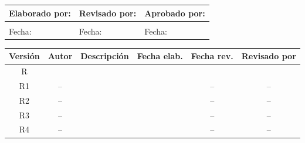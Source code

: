 \begin{titlepage}
	\thispagestyle{corporativo}

	\vspace*{1.5cm}

	\centering
	{\Large\bfseries \projecttitle}

	\vspace{3cm}

	\begin{center}
	\fontsize{10}{12}\selectfont
	\renewcommand{\arraystretch}{1.5}
	\setlength{\tabcolsep}{4pt}

	\begin{tabular}{|p{}|p{}|p{}|}
		\hline
		\rowcolor{green!15}
		\textbf{Elaborado por:} & \textbf{Revisado por:} & \textbf{Aprobado por:} \\
		\hline
		\centering\arraybackslash\vspace{1.2cm} \firmaElaboro & \centering\arraybackslash\vspace{1.2cm} \firmaReviso & \centering\arraybackslash\vspace{1.2cm} \firmaAprobo \\
		\hline
		\centering\arraybackslash Fecha: \fechaElaboro & \centering\arraybackslash Fecha: \fechaReviso & \centering\arraybackslash Fecha: \fechaAprobo \\
		\hline
	\end{tabular}
	\end{center}

	\vspace{2.5cm}

	\begin{center}
	\fontsize{10}{12}\selectfont
	\renewcommand{\arraystretch}{1.2}
	\setlength{\tabcolsep}{3pt}

	\begin{tabular}{|c|c|p{}|c|c|c|}
		\hline
		\rowcolor{green!15}
		\textbf{Versión} & \textbf{Autor} & \textbf{Descripción} & \textbf{Fecha elab.} & \textbf{Fecha rev.} & \textbf{Revisado por} \\
		\hline
		R\docRevision & \firmaElaboro & \descRevCero & \fechaElaboro & \fechaReviso & \firmaReviso \\
		\hline
		R1 & -- & \descRevUno & \fechaRevUno & -- & -- \\
		\hline
		R2 & -- & \descRevDos & \fechaRevDos & -- & -- \\
		\hline
		R3 & -- & \descRevTres & \fechaRevTres & -- & -- \\
		\hline
		R4 & -- & \descRevCuatro & \fechaRevCuatro & -- & -- \\
		\hline
	\end{tabular}
	\end{center}

	\vfill

\end{titlepage}
